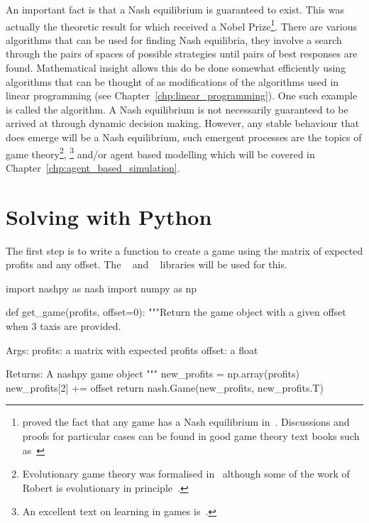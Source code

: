 An important fact is that a Nash equilibrium is guaranteed to exist.
This was actually the theoretic result for which  received a Nobel
Prize\footnote{
 proved the fact that any game has a Nash equilibrium
in~\cite{nash1950equilibrium}. Discussions and proofs for particular cases
can be found in good game theory text books such as~\cite{maschler2013game}
}.
There are various algorithms that can be used for finding Nash
equilibria, they involve
a search through the pairs of spaces of possible strategies until pairs of best
responses are found. Mathematical insight allows this do be done somewhat efficiently
using algorithms that can be thought of as modifications of the algorithms used
in linear programming (see Chapter~\ref{chp:linear_programming}).
One such example is called the  algorithm.
A Nash equilibrium is not necessarily guaranteed to be arrived at through
dynamic decision making. However, any stable
behaviour that does emerge will be a Nash
equilibrium, such emergent processes are the topics of  game
theory\footnote{
Evolutionary game theory was formalised in~\cite{smith1974theory} although
some of the work of Robert  is evolutionary in
principle~\cite{axelrod1990evolution}.
},
\footnote{
An excellent text on learning in games is~\cite{fudenberg1998theory}.
}
and/or agent based modelling which will be covered in
Chapter~\ref{chp:agent_based_simulation}.

\section{Solving with Python}\label{sec:game_theory_solving-with-python}

The first step is to write a function to create a game using the
matrix of expected profits and any offset. The ~\cite{knight2018nashpy}
and ~\cite{harris2020array} libraries will be used for this.

\begin{pyin}
import nashpy as nash
import numpy as np


def get_game(profits, offset=0):
    """Return the game object with a given offset when 3 taxis are
    provided.

    Args:
        profits: a matrix with expected profits
        offset: a float

    Returns:
        A nashpy game object
    """
    new_profits = np.array(profits)
    new_profits[2] += offset
    return nash.Game(new_profits, new_profits.T)
\end{pyin}



